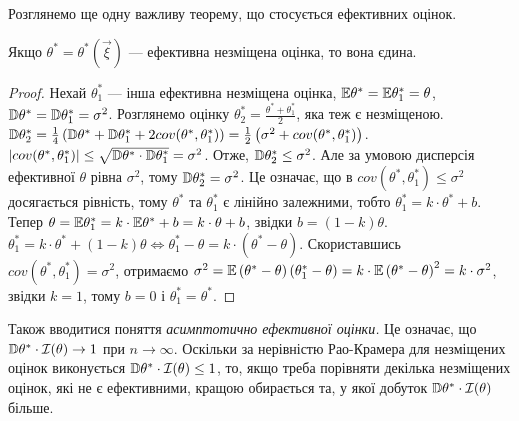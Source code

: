 Розглянемо ще одну важливу теорему, що стосується ефективних оцінок.
\begin{theorem*}
    Якщо $\theta^* = \theta^* (\vec{\xi})$ --- ефективна незміщена оцінка, то вона єдина.
\end{theorem*}
\begin{proof}
    Нехай $\theta_1^*$ --- інша ефективна незміщена оцінка, $\mathbb{E}\theta^* = \mathbb{E}\theta_1^* = \theta$,
    $\mathbb{D}\theta^* = \mathbb{D}\theta_1^* = \sigma^2$. Розглянемо оцінку $\theta_2^* = \frac{\theta^* + \theta_1^*}{2}$, яка теж є незміщеною.
    $\mathbb{D}\theta_2^* = \frac{1}{4}\left(\mathbb{D}\theta^* + \mathbb{D}\theta_1^* + 2{cov}(\theta^*, \theta_1^*) \right) = \frac{1}{2}\left( \sigma^2 + {cov}(\theta^*, \theta_1^*)\right)$.
    $\left|{cov}(\theta^*, \theta_1^*) \right| \leq \sqrt{\mathbb{D}\theta^* \cdot \mathbb{D}\theta_1^*} = \sigma^2$.
    Отже, $\mathbb{D}\theta_2^* \leq \sigma^2$. Але за умовою дисперсія ефективної $\theta$ рівна $\sigma^2$, тому $\mathbb{D}\theta_2^* = \sigma^2$.
    Це означає, що в ${cov}(\theta^*, \theta_1^*) \leq \sigma^2$ досягається рівність, тому $\theta^*$ та $\theta_1^*$ є лінійно залежними, тобто
    $\theta_1^* = k\cdot \theta^* + b$. Тепер $\theta = \mathbb{E}\theta_1^* = k\cdot \mathbb{E}\theta^* + b = k\cdot \theta + b$, звідки $b = (1-k)\theta$.
    $\theta_1^* = k\cdot \theta^* + (1-k)\theta \Leftrightarrow \theta_1^* - \theta = k \cdot \left(\theta^* - \theta \right)$.
    Скориставшись ${cov}(\theta^*, \theta_1^*) = \sigma^2$, отримаємо 
    $\sigma^2 = \mathbb{E}\left(\theta^* - \theta \right)\left(\theta_1^* - \theta \right) = k \cdot \mathbb{E}\left(\theta^* - \theta \right)^2 = k \cdot \sigma^2$,
    звідки $k = 1$, тому $b = 0$ і $\theta^*_1 = \theta^*$.
\end{proof}

Також вводитися поняття \emph{асимптотично ефективної оцінки.} Це означає, що 
$\mathbb{D}\theta^* \cdot \mathcal{I}(\theta) \to 1$ при $n\to\infty$. Оскільки за нерівністю Рао-Крамера для незміщених оцінок
виконується $\mathbb{D}\theta^* \cdot \mathcal{I}(\theta) \leq 1$, то, якщо треба порівняти декілька незміщених оцінок,
 які не є ефективними, кращою обирається та, у якої добуток $\mathbb{D}\theta^* \cdot \mathcal{I}(\theta)$ більше.


